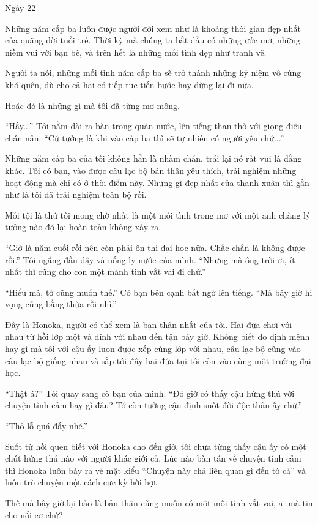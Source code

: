 {Ngày 22}
{
Những năm cấp ba luôn được người đời xem như là khoảng thời gian đẹp
nhất của quãng đời tuổi trẻ. Thời kỳ mà chúng ta bắt đầu có những ước
mơ, những niềm vui với bạn bè, và trên hết là những mối tình đẹp như
tranh vẽ.

Người ta nói, những mối tình năm cấp ba sẽ trở thành những kỷ niệm vô
cùng khó quên, dù cho cả hai có tiếp tục tiến bước hay dừng lại đi nữa.

Hoặc đó là những gì mà tôi đã từng mơ mộng.

``Hầy...'' Tôi nằm dài ra bàn trong quán nước, lên tiếng than thở với
giọng điệu chán nản. ``Cứ tưởng là khi vào cấp ba thì sẽ tự nhiên có
người yêu chứ...''

Những năm cấp ba của tôi không hẳn là nhàm chán, trái lại nó rất vui là
đằng khác. Tôi có bạn, vào được câu lạc bộ bản thân yêu thích, trải
nghiệm những hoạt động mà chỉ có ở thời điểm này. Những gì đẹp nhất của
thanh xuân thì gần như là tôi đã trải nghiệm toàn bộ rồi.

Mỗi tội là thứ tôi mong chờ nhất là một mối tình trong mơ với một anh
chàng lý tưởng nào đó lại hoàn toàn không xảy ra.

``Giờ là năm cuối rồi nên còn phải ôn thi đại học nữa. Chắc chắn là
không được rồi.'' Tôi ngẩng đầu dậy và uống ly nước của mình. ``Nhưng mà
ông trời ơi, ít nhất thì cũng cho con một mảnh tình vắt vai đi chứ.''

``Hiểu mà, tớ cũng muốn thế.'' Cô bạn bên cạnh bất ngờ lên tiếng. ``Mà
bây giờ hi vọng cũng bằng thừa rồi nhỉ.''

Đây là Honoka, người có thể xem là bạn thân nhất của tôi. Hai đứa chơi
với nhau từ hồi lớp một và dính với nhau đến tận bây giờ. Không biết do
định mệnh hay gì mà tôi với cậu ấy luon được xếp cùng lớp với nhau, câu
lạc bộ cũng vào câu lạc bộ giống nhau và sắp tới đây hai đứa tụi tôi còn
vào cùng một trường đại học.

``Thật á?'' Tôi quay sang cô bạn của mình. ``Đó giờ có thấy cậu hứng thú
với chuyện tình cảm hay gì đâu? Tớ còn tưởng cậu định suốt đời độc thân
ấy chứ.''

``Thô lỗ quá đấy nhé.''

Suốt từ hồi quen biết với Honoka cho đến giờ, tôi chưa từng thấy cậu ấy
có một chút hứng thú nào với người khác giới cả. Lúc nào bàn tán về
chuyện tình cảm thì Honoka luôn bày ra vẻ mặt kiểu ``Chuyện này chả liên
quan gì đến tớ cả'' và luôn trò chuyện một cách cực kỳ hời hợt.

Thế mà bây giờ lại bảo là bản thân cũng muốn có một mối tình vắt vai, ai
mà tin cho nổi cơ chứ?

}

